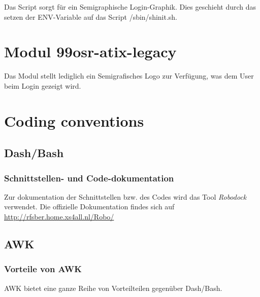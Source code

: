 \documentclass[10pt,a4paper]{article}
\begin{document}
Das Script sorgt für ein Semigraphische Login-Graphik. Dies geschieht durch das setzen der ENV-Variable auf das Script /sbin/shinit.sh.

\section{Modul 99osr-atix-legacy}

Das Modul stellt lediglich ein Semigrafisches Logo zur Verfügung, was dem User beim Login gezeigt wird.

\section{Coding conventions}

\subsection{Dash/Bash}

\subsubsection{Schnittstellen- und Code-dokumentation}

Zur dokumentation der Schnittstellen bzw. des Codes wird das Tool \textit{Robodock} verwendet.
Die offizielle Dokumentation findes sich auf \url{http://rfsber.home.xs4all.nl/Robo/}



\subsection{AWK}

\subsubsection{Vorteile von AWK}

AWK bietet eine ganze Reihe von Vorteilteilen gegenüber Dash/Bash.
\end{document}
